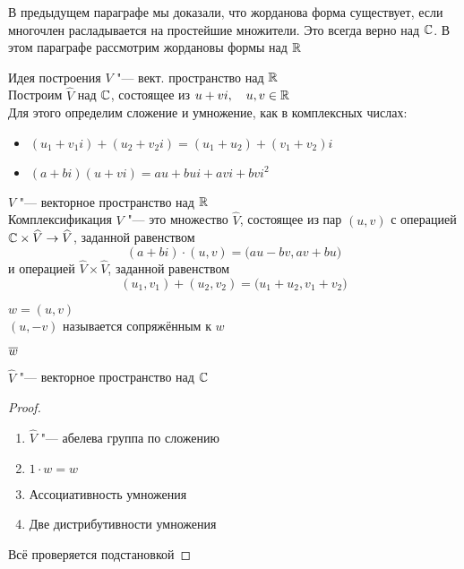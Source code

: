 В предыдущем параграфе мы доказали, что жорданова форма существует, если многочлен расладывается на простейшие множители. Это всегда верно над $ \mathbb{C} $. В этом параграфе рассмотрим жордановы формы над $ \mathbb{R} $

\begin{undefthm}{Идея построения}
	$ V $ "--- вект. пространство над $ \mathbb{R} $ \\
	Построим $ \hat{V} $ над $ \mathbb{C} $, состоящее из $ u + vi, \quad u, v \in \mathbb{R} $ \\
	Для этого определим сложение и умножение, как в комплексных числах:
	\begin{itemize}
		\item $ (u_1 + v_1i) + (u_2 + v_2i) = (u_1 + u_2) + (v_1 + v_2)i $
		\item $ (a + bi)(u + vi) = au + bui + avi + bvi^2 $
	\end{itemize}
\end{undefthm}

\begin{definition}
	$ V $ "--- векторное пространство над $ \mathbb{R} $ \\
	Комплексификация $ V $ "--- это множество $ \hat{V} $, состоящее из пар $ (u, v) $ с операцией $ \mathbb{C} \times \widehat{V} \to \widehat{V} $, заданной равенством
	$$ (a + bi) \cdot (u, v) = \big( au - bv, av + bu \big) $$
	и операцией $ \hat{V} \times \hat{V} $, заданной равенством
	$$ (u_1, v_1) + (u_2, v_2) = \big( u_1 + u_2, v_1 + v_2 \big) $$
\end{definition}

\begin{definition}
	$ w = (u, v) $ \\
	$ (u, -v) $ называется сопряжённым к $ w $
\end{definition}

\begin{notation}
	$ \overline{w} $
\end{notation}

\begin{theorem}
	$ \hat{V} $ "--- векторное пространство над $ \mathbb{C} $
\end{theorem}

\begin{proof}
	\hfill
	\begin{enumerate}
		\item $ \hat{V} $ "--- абелева группа по сложению
		\item $ 1 \cdot w = w $
		\item Ассоциативность умножения
		\item Две дистрибутивности умножения
	\end{enumerate}
	Всё проверяется подстановкой
\end{proof}

